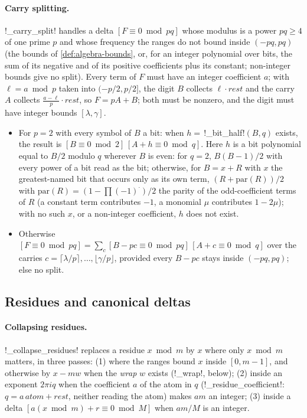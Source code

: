 \paragraph{Carry splitting.} \py!_carry_split! handles a delta $[F\equiv0\bmod pq]$ whose modulus is a power $pq\ge4$ of one prime $p$ and whose frequency the ranges do not bound inside $(-pq,pq)$ (the bounds of \cref{def:algebra-bounds}, or, for an integer polynomial over bits, the sum of its negative and of its positive coefficients plus its constant; non-integer bounds give no split). Every term of $F$ must have an integer coefficient $a$; with $\ell=a\bmod p$ taken into $(-p/2,p/2]$, the digit $B$ collects $\ell\cdot\mathit{rest}$ and the carry $A$ collects $\tfrac{a-\ell}p\cdot\mathit{rest}$, so $F=pA+B$; both must be nonzero, and the digit must have integer bounds $[\lambda,\gamma]$.
\begin{itemize}
\item For $p=2$ with every symbol of $B$ a bit: when $h=$\,\py!_bit_half!$(B,q)$ exists, the result is $[B\equiv0\bmod2]\,[A+h\equiv0\bmod q]$. Here $h$ is a bit polynomial equal to $B/2$ modulo $q$ wherever $B$ is even: for $q=2$, $B(B-1)/2$ with every power of a bit read as the bit; otherwise, for $B=x+R$ with $x$ the greatest-named bit that occurs only as its own term, $(R+\mathrm{par}(R))/2$ with $\mathrm{par}(R)=(1-\prod(-1)^{\cdot})/2$ the parity of the odd-coefficient terms of $R$ (a constant term contributes $-1$, a monomial $\mu$ contributes $1-2\mu$); with no such $x$, or a non-integer coefficient, $h$ does not exist.
\item Otherwise $[F\equiv0\bmod pq]=\sum_c[B-pc\equiv0\bmod pq]\,[A+c\equiv0\bmod q]$ over the carries $c=\lceil\lambda/p\rceil,\ldots,\lfloor\gamma/p\rfloor$, provided every $B-pc$ stays inside $(-pq,pq)$; else no split.
\end{itemize}

\subsection{Residues and canonical deltas}\label{sec:algebra-simplify-residues}

\paragraph{Collapsing residues.} \py!_collapse_residues! replaces a residue $x\bmod m$ by $x$ where only $x\bmod m$ matters, in three passes: (1) where the ranges bound $x$ inside $[0,m-1]$, and otherwise by $x-mw$ when the \emph{wrap} $w$ exists (\py!_wrap!, below); (2) inside an exponent $2\pi i q$ when the coefficient $a$ of the atom in $q$ (\py!_residue_coefficient!: $q=a\,\mathit{atom}+\mathit{rest}$, neither reading the atom) makes $am$ an integer; (3) inside a delta $[a(x\bmod m)+r\equiv0\bmod M]$ when $am/M$ is an integer.


